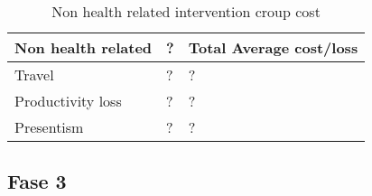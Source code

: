 \begin{table}[H]
\begin{longtabu} to 
    \textbf{Non health related} &        \textbf{?} & \textbf{Total Average cost/loss} \\[-1ex]
    \midrule
     Travel   &    ? & ? \\ \hline
     Productivity loss   &       ? & ? \\ \hline
     Presentism   &        ? & ?
    \newline
   \end{longtabu}
\caption{Non health related intervention croup cost}
\label{tab: IC}
\end{table}

\subsection{Fase 3}

















